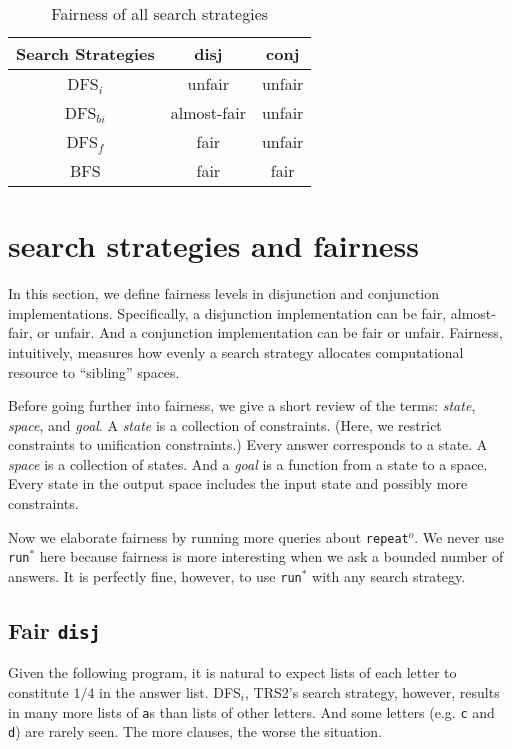 \documentclass[acmlarge, review=true]{acmart}
\newcommand{\conj}{\texttt{conj}}
\newcommand{\disj}{\texttt{disj}}
\newcommand{\repeato}{\texttt{repeat$^o$}}
\newcommand{\runstar}{\texttt{run$^*$}}
\newcommand{\DFSi }[0]{DFS$_{i}$}
\newcommand{\DFSf }[0]{DFS$_{f}$}
\newcommand{\DFSbi}[0]{DFS$_{bi}$}
\newcommand{\BFS}[0]{BFS}
\begin{document}
\begin{table}[h]
	\begin{tabular}{|c|c|c|}
		\hline 
		Search Strategies & disj & conj \\ 
		\hline 
		\DFSi & unfair & unfair \\ 
		\hline 
		\DFSbi & almost-fair & unfair \\ 
		\hline 
		\DFSf & fair & unfair \\ 
		\hline 
		\BFS & fair & fair \\ 
		\hline 
	\end{tabular} 
	\caption{Fairness of all search strategies}
	\label{table-fairness}
\end{table}

\section{search strategies and fairness}

In this section, we define fairness levels in disjunction and conjunction
implementations. Specifically, a disjunction implementation can be
fair, almost-fair, or unfair. And a conjunction implementation can be
fair or unfair. Fairness, intuitively, measures how evenly a search strategy 
allocates computational resource to ``sibling'' spaces.

Before going further into fairness, we give a short review of the terms:
\emph{state}, \emph{space}, and \emph{goal}.
A \emph{state} is a collection of constraints. (Here, we restrict 
constraints to unification constraints.) Every answer corresponds to a 
state. A \emph{space} is a collection of states. And a \emph{goal} is a 
function from a state to a space.
Every state in the output space includes the input state and possibly more 
constraints.

Now we elaborate fairness by running more queries about \repeato{}. We never 
use \runstar{} here because fairness is more interesting when we 
ask a bounded number of answers. It is perfectly fine, however, to use 
\runstar{} with any search strategy.

\subsection{Fair \texttt{disj}}

Given the following program, it is natural to expect lists of each
letter to constitute $1/4$ in the answer list. \DFSi, TRS2's search
strategy, however, results in many more lists of \texttt{a}s than
lists of other letters. And some letters (e.g. \texttt{c} and
\texttt{d}) are rarely seen. The more clauses, the worse the situation.
\end{document}
